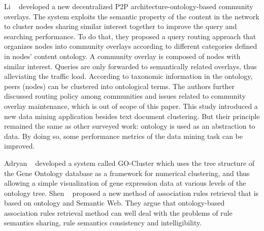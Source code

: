Li \etal~\cite{Li2005Ont} developed a new decentralized P2P architecture-ontology-based community overlays. The system exploits the semantic property of the content in the network to cluster nodes sharing similar interest together to improve the query and searching performance. To do that, they proposed a query routing approach that organizes nodes into community overlays according to different categories defined in nodes' content ontology. A community overlay is composed of nodes with similar interest. Queries are only forwarded to semantically related overlays, thus alleviating the traffic load. According to taxonomic information in the ontology, peers (nodes) can be clustered into ontological terms. The authors further discussed routing policy among communities and issues related to community overlay maintenance, which is out of scope of this paper. This study introduced a new data mining application besides text document clustering. But their principle remained the same as other surveyed work: ontology is used as an abstraction to data. By doing so, some performance metrics of the data mining task can be improved.

Adryan \etal~\cite{Adryan2004} developed a system called GO-Cluster which uses the tree structure of the Gene Ontology database as a framework for numerical clustering, and thus allowing a simple visualization of gene expression data at various levels of the ontology tree. Shen \etal~\cite{Shen2006Ont} proposed a new method of association rules retrieval that is based on ontology and Semantic Web. They argue that ontology-based association rules retrieval method can well deal with the problems of rule semantics sharing, rule semantics consistency and intelligibility.

